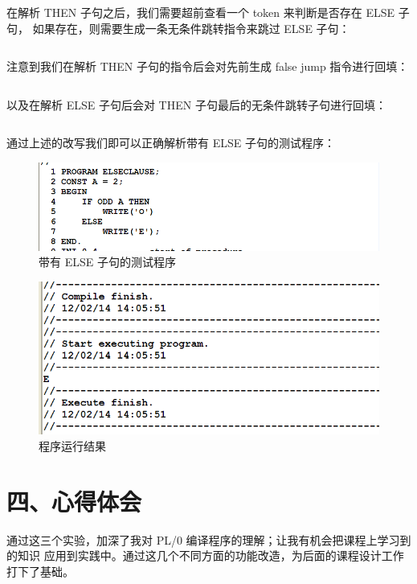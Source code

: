 \documentclass[]{guo}
\begin{document}
在解析 THEN 子句之后，我们需要超前查看一个 token 来判断是否存在 ELSE 子句，
如果存在，则需要生成一条无条件跳转指令来跳过 ELSE 子句：

\inputminted[baselinestretch=0.75,firstline=1826,lastline=1842,fontsize=\fontlm]{cpp}{Unit1.cpp}

注意到我们在解析 THEN 子句的指令后会对先前生成 false jump 指令进行回填：

\inputminted[baselinestretch=0.75,firstline=1837,lastline=1837,fontsize=\fontlm]{cpp}{Unit1.cpp}

以及在解析 ELSE 子句后会对 THEN 子句最后的无条件跳转子句进行回填：

\inputminted[baselinestretch=0.75,firstline=1839,lastline=1839,fontsize=\fontlm]{cpp}{Unit1.cpp}

通过上述的改写我们即可以正确解析带有 ELSE 子句的测试程序：

\begin{figure}[h!]
    \caption{带有 ELSE 子句的测试程序}
    \centering
        \includegraphics[scale=0.5]{figure/else_clause.png}
\end{figure}

\begin{figure}[h!]
    \caption{程序运行结果}
    \centering
        \includegraphics[scale=0.4]{figure/else_clause-output.png}
\end{figure}

\clearpage

\section{四、心得体会}

通过这三个实验，加深了我对 PL/0 编译程序的理解；让我有机会把课程上学习到的知识
应用到实践中。通过这几个不同方面的功能改造，为后面的课程设计工作打下了基础。
\end{document}
